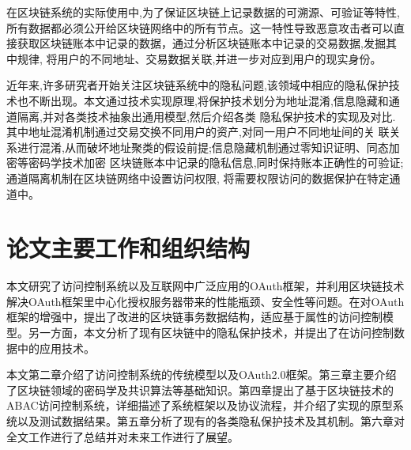 在区块链系统的实际使用中,为了保证区块链上记录数据的可溯源、可验证等特性,所有数据都必须公开给区块链网络中的所有节点。这一特性导致恶意攻击者可以直接获取区块链账本中记录的数据，通过分析区块链账本中记录的交易数据,发掘其中规律, 将用户的不同地址、交易数据关联,并进一步对应到用户的现实身份。 
	
近年来,许多研究者开始关注区块链系统中的隐私问题,该领域中相应的隐私保护技术也不断出现。本文通过技术实现原理,将保护技术划分为地址混淆,信息隐藏和通道隔离,并对各类技术抽象出通用模型,然后介绍各类 隐私保护技术的实现及对比.其中地址混淆机制通过交易交换不同用户的资产,对同一用户不同地址间的关 联关系进行混淆,从而破坏地址聚类的假设前提;信息隐藏机制通过零知识证明、同态加密等密码学技术加密 区块链账本中记录的隐私信息,同时保持账本正确性的可验证;通道隔离机制在区块链网络中设置访问权限, 将需要权限访问的数据保护在特定通道中。

\section{论文主要工作和组织结构}

本文研究了访问控制系统以及互联网中广泛应用的OAuth框架，并利用区块链技术解决OAuth框架里中心化授权服务器带来的性能瓶颈、安全性等问题。在对OAuth框架的增强中，提出了改进的区块链事务数据结构，适应基于属性的访问控制模型。另一方面，本文分析了现有区块链中的隐私保护技术，并提出了在访问控制数据中的应用技术。

本文第二章介绍了访问控制系统的传统模型以及OAuth2.0框架。第三章主要介绍了区块链领域的密码学及共识算法等基础知识。第四章提出了基于区块链技术的ABAC访问控制系统，详细描述了系统框架以及协议流程，并介绍了实现的原型系统以及测试数据结果。第五章分析了现有的各类隐私保护技术及其机制。第六章对全文工作进行了总结并对未来工作进行了展望。

